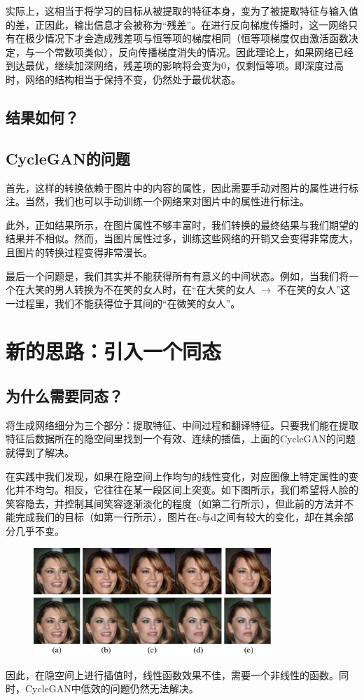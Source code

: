 \documentclass[UTF8,a4paper，12pt]{article}
\theoremstyle{theorem}
\theoremstyle{definition}
\begin{document}
实际上，这相当于将学习的目标从被提取的特征本身，变为了被提取特征与输入值的差，正因此，输出信息才会被称为“残差”。在进行反向梯度传播时，这一网络只有在极少情况下才会造成残差项与恒等项的梯度相同（恒等项梯度仅由激活函数决定，与一个常数项类似），反向传播梯度消失的情况。因此理论上，如果网络已经到达最优，继续加深网络，残差项的影响将会变为0，仅剩恒等项。即深度过高时，网络的结构相当于保持不变，仍然处于最优状态。

\subsection{结果如何？}

\subsection{CycleGAN的问题}

首先，这样的转换依赖于图片中的内容的属性，因此需要手动对图片的属性进行标注。当然，我们也可以手动训练一个网络来对图片中的属性进行标注。

此外，正如结果所示，在图片属性不够丰富时，我们转换的最终结果与我们期望的结果并不相似。然而，当图片属性过多，训练这些网络的开销又会变得非常庞大，且图片的转换过程变得非常漫长。

最后一个问题是，我们其实并不能获得所有有意义的中间状态。例如，当我们将一个在大笑的男人转换为不在笑的女人时，在“在大笑的女人 $\rightarrow$ 不在笑的女人”这一过程里，我们不能获得位于其间的“在微笑的女人”。

\section{新的思路：引入一个同态}

\subsection{为什么需要同态？}

将生成网络细分为三个部分：提取特征、中间过程和翻译特征。只要我们能在提取特征后数据所在的隐空间里找到一个有效、连续的插值，上面的CycleGAN的问题就得到了解决。

在实践中我们发现，如果在隐空间上作均匀的线性变化，对应图像上特定属性的变化并不均匀。相反，它往往在某一段区间上突变。如下图所示，我们希望将人脸的笑容隐去，并控制其间笑容逐渐淡化的程度（如第二行所示），但此前的方法并不能完成我们的目标（如第一行所示），图片在c与d之间有较大的变化，却在其余部分几乎不变。

\begin{figure}[htbp]
	\centering
	\includegraphics[width=0.8\textwidth]{assets/10}
	\caption{}
\end{figure}
因此，在隐空间上进行插值时，线性函数效果不佳，需要一个非线性的函数。同时，CycleGAN中低效的问题仍然无法解决。
\end{document}
